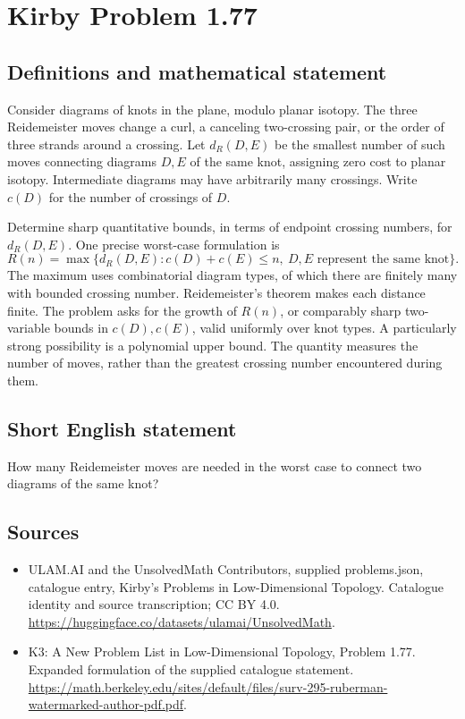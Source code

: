 \documentclass[11pt,a4paper]{article}
\begin{document}
\section*{Kirby Problem 1.77}\label{statement}

\subsection{Definitions and mathematical statement}
Consider diagrams of knots in the plane, modulo planar isotopy. The three
Reidemeister moves change a curl, a canceling two-crossing pair, or the order of
three strands around a crossing. Let $d_R(D,E)$ be the smallest number of such
moves connecting diagrams $D,E$ of the same knot, assigning zero cost to planar
isotopy. Intermediate diagrams may have arbitrarily many crossings.
Write $c(D)$ for the number of crossings of $D$.

Determine sharp quantitative bounds, in terms of endpoint crossing numbers,
for $d_R(D,E)$. One precise worst-case formulation is
\[
R(n)=\max\{d_R(D,E):c(D)+c(E)\leq n,\ D,E\text{ represent the same knot}\}.
\]
The maximum uses combinatorial diagram types, of which there are finitely many
with bounded crossing number. Reidemeister's theorem makes each distance finite.
The problem asks for the growth of $R(n)$, or comparably sharp two-variable
bounds in $c(D),c(E)$, valid uniformly over knot types. A particularly strong
possibility is a polynomial upper bound. The quantity measures the number of
moves, rather than the greatest crossing number encountered during them.
\subsection{Short English statement}
How many Reidemeister moves are needed in the worst case to connect two diagrams of the same knot?
\subsection{Sources}
\begin{itemize}
\item[S1] ULAM.AI and the UnsolvedMath Contributors, supplied problems.json, catalogue entry, Kirby's Problems in Low-Dimensional Topology. Catalogue identity and source transcription; CC BY 4.0.
\url{https://huggingface.co/datasets/ulamai/UnsolvedMath}.
\item[S2] K3: A New Problem List in Low-Dimensional Topology, Problem 1.77. Expanded formulation of the supplied catalogue statement.
\url{https://math.berkeley.edu/sites/default/files/surv-295-ruberman-watermarked-author-pdf.pdf}.
\end{itemize}
\end{document}
